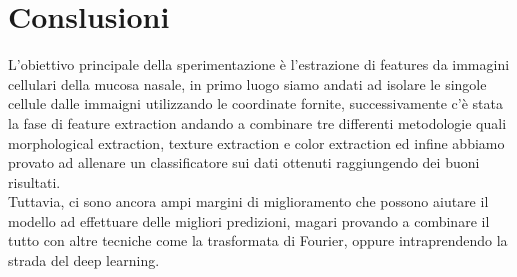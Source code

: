 \documentclass[italian,10pt,a4paper]{article}
\begin{document}
	\section{Conslusioni}
	L'obiettivo principale della sperimentazione è l'estrazione di features da immagini cellulari della mucosa nasale, in primo luogo siamo andati ad isolare le singole cellule dalle immaigni utilizzando le coordinate fornite, successivamente c'è stata la fase di feature extraction andando a combinare tre differenti metodologie quali morphological extraction, texture extraction e color extraction ed infine abbiamo provato ad allenare un classificatore sui dati ottenuti raggiungendo dei buoni risultati.\\
	Tuttavia, ci sono ancora ampi margini di miglioramento che possono aiutare il modello ad effettuare delle migliori predizioni, magari provando a combinare il tutto con altre tecniche come la trasformata di Fourier, oppure intraprendendo la strada del deep learning.
	
	
	
	
	
\end{document}
